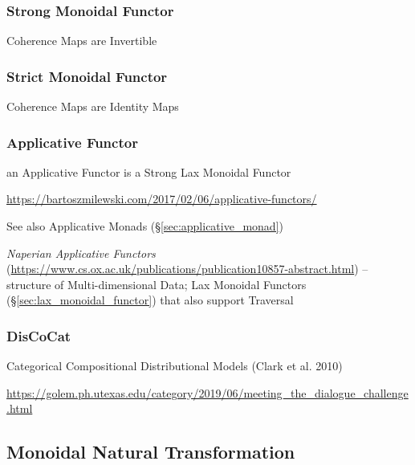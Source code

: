 \subsubsection{Strong Monoidal Functor}\label{sec:strong_monoidal_functor}

Coherence Maps are Invertible



\subsubsection{Strict Monoidal Functor}\label{sec:strict_monoidal_functor}

Coherence Maps are Identity Maps



\subsubsection{Applicative Functor}\label{sec:applicative_functor}

an Applicative Functor is a Strong Lax Monoidal Functor

\url{https://bartoszmilewski.com/2017/02/06/applicative-functors/}

\fist See also Applicative Monads (\S\ref{sec:applicative_monad})

\emph{Naperian Applicative Functors}
(\url{https://www.cs.ox.ac.uk/publications/publication10857-abstract.html}) --
structure of Multi-dimensional Data; Lax Monoidal Functors
(\S\ref{sec:lax_monoidal_functor}) that also support Traversal



\subsubsection{DisCoCat}\label{sec:discocat}


Categorical Compositional Distributional Models (Clark et al. 2010)

\url{https://golem.ph.utexas.edu/category/2019/06/meeting_the_dialogue_challenge.html}



\subsection{Monoidal Natural Transformation}
\label{sec:monoidal_natural_transformation}


